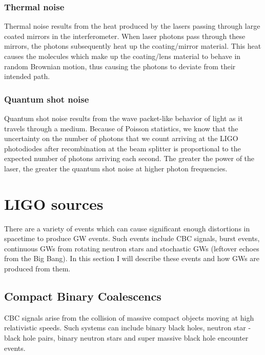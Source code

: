 %
%
\subsubsection{Thermal noise}
Thermal noise results from the heat produced by 
the lasers passing through large coated mirrors in 
the interferometer. When laser photons pass through 
these mirrors, the photons subsequently heat up 
the coating/mirror material. This heat causes the molecules 
which make up the coating/lens material to behave in 
random Brownian motion, thus causing the photons to deviate from 
their intended path.

\subsubsection{Quantum shot noise}
Quantum shot noise results from the wave packet-like 
behavior of light as it travels through a medium. 
Because of Poisson statistics, we know that the 
uncertainty on the number of photons that we 
count arriving at the \ac{LIGO} photodiodes 
after recombination at the beam splitter is 
proportional to the expected number of photons 
arriving each second. The greater the power 
of the laser, the greater the quantum shot 
noise at higher photon frequencies.

\section{LIGO sources}

There are a variety of events which can cause significant 
enough distortions in spacetime to produce 
\ac{GW} events. Such events include \ac{CBC} signals, burst events,
continuous \ac{GW}s from rotating neutron stars and 
stochastic \ac{GW}s (leftover echoes from the Big Bang). In this 
section I will describe these events and how \ac{GW}s are 
produced from them.

\subsection{Compact Binary Coalescencs}

\ac{CBC} signals arise from the collision of massive compact 
objects moving at high relativistic speeds. Such systems can 
include binary black holes, neutron star - black hole pairs, binary 
neutron stars and super massive black hole encounter events. 

